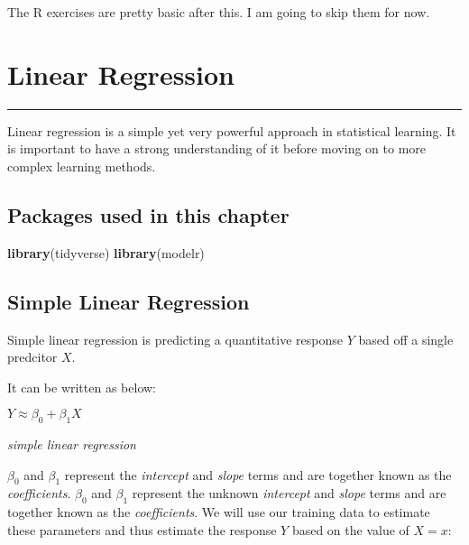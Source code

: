 \documentclass[]{book}
\newenvironment{Shaded}{\begin{snugshade}}{\end{snugshade}}
\newcommand{\KeywordTok}[1]{\textcolor[rgb]{0.13,0.29,0.53}{\textbf{#1}}}
\newcommand{\NormalTok}[1]{#1}
\begin{document}
The R exercises are pretty basic after this. I am going to skip them for now.

\hypertarget{linear-regression}{%
\chapter{Linear Regression}\label{linear-regression}}

\begin{center}\rule{0.5\linewidth}{\linethickness}\end{center}

Linear regression is a simple yet very powerful approach in statistical learning. It is important to have a strong understanding of it before moving on to more complex learning methods.

\hypertarget{packages-used-in-this-chapter}{%
\section{Packages used in this chapter}\label{packages-used-in-this-chapter}}

\begin{Shaded}
\begin{Highlighting}[]
\KeywordTok{library}\NormalTok{(tidyverse)}
\KeywordTok{library}\NormalTok{(modelr)}
\end{Highlighting}
\end{Shaded}

\hypertarget{simple-linear-regression}{%
\section{Simple Linear Regression}\label{simple-linear-regression}}

Simple linear regression is predicting a quantitative response \(Y\) based off a single predcitor \(X\).

It can be written as below:

\(Y \approx \beta_0 + \beta_1X\)

\emph{simple linear regression}

\(\beta_0\) and \(\beta_1\) represent the \emph{intercept} and \emph{slope} terms and are together known as the \emph{coefficients}.
\(\beta_0\) and \(\beta_1\) represent the unknown \emph{intercept} and \emph{slope} terms and are together known as the \emph{coefficients}. We will use our training data to estimate these parameters and thus estimate the response \(Y\) based on the value of \(X = x\):
\end{document}
